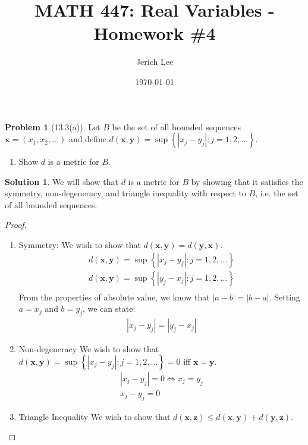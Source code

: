 \documentclass[12pt]{article}
\title{MATH 447: Real Variables - Homework \#4}
\author{Jerich Lee}
\date{\today}
\theoremstyle{definition} %
\newtheorem{solution}{Solution}
\newtheorem{problem}{Problem}
\theoremstyle{plain} %
\begin{document}
\maketitle

\begin{problem}[13.3(a)]
Let \(B\) be the set of all bounded sequences \(\mathbf{x} = (x_{1}, x_{2}, \ldots)\) and define \(d(\mathbf{x}, \mathbf{y})=\sup \left\{ \left\vert x_{j}-y_{j}  \right\vert :j=1,2, \ldots   \right\} \).
\begin{enumerate}
    \item Show \(d\) is a metric for \(B\). 
\end{enumerate}
\end{problem}

\begin{solution}
We will show that \(d\) is a metric for \(B\) by showing that it satisfies the symmetry, non-degeneracy, and triangle inequality with respect to \(B\), i.e. the set of all bounded sequences.
\begin{proof}
 \begin{enumerate}
    \item Symmetry: 
    We wish to show that \(d(\mathbf{x}, \mathbf{y})=d(\mathbf{y}, \mathbf{x})\).  \begin{align} d(\mathbf{x}, \mathbf{y}) = \sup\left\{ \left\vert x_{j}-y_{j} \right\vert : j=1,2, \ldots   \right\} \\[10pt]  d(\mathbf{x}, \mathbf{y}) = \sup\left\{ \left\vert y_{j}-x_{j} \right\vert : j=1,2, \ldots   \right\} \\[10pt] \end{align} From the properties of absolute value, we know that \(\left\vert a-b \right\vert = \left\vert b-a \right\vert \). Setting \(a=x_{j}\) and \(b=y_{j} \), we can state: \begin{align} \left\vert x_{j} -y_{j}  \right\vert =\left\vert y_{j} -x_{j}  \right\vert \end{align} \item Non-degeneracy We wish to show that \(d(\mathbf{x},\mathbf{y} )=\sup \left\{ \left\vert x_{j}-y_{j}  \right\vert : j=1,2, \ldots   \right\}=0 \) iff \(\mathbf{x} =\mathbf{y} \).
   \begin{align}
    \left\vert x_{j} -y_{j}  \right\vert =0  \iff x_{j} =y_{j} \\[10pt] 
    x_{j} -y_{j} =0    
   \end{align}
   \item Triangle Inequality
   We wish to show that \(d(\mathbf{x}, \mathbf{z})\leq d(\mathbf{x},\mathbf{y})+d(\mathbf{y}, \mathbf{z})\).

\end{enumerate}
\end{proof}
\end{solution}
\end{document}
